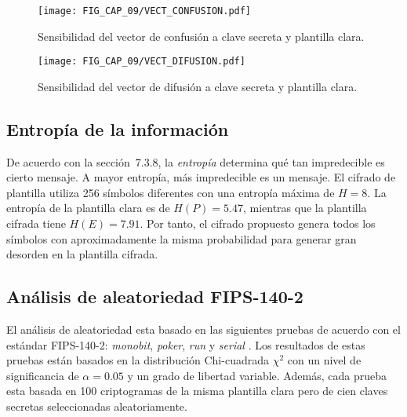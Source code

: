 \begin{figure}[!htbp] %
	\center
	\texttt{[image: FIG\_CAP\_09/VECT\_CONFUSION.pdf]}     
	\caption{Sensibilidad del vector de confusión a clave secreta y plantilla clara.}
\end{figure} 

\begin{figure}[!htbp] %
	\center
	\texttt{[image: FIG\_CAP\_09/VECT\_DIFUSION.pdf]}      
	\caption{Sensibilidad del vector de difusión a clave secreta y plantilla clara.}
\end{figure} 

\subsection{Entropía de la información}
De acuerdo con la sección~7.3.8, la \textit{entropía} determina qué tan impredecible es cierto mensaje. A mayor entropía, más impredecible es un mensaje. El cifrado de plantilla utiliza 256 símbolos diferentes con una entropía máxima de $H=8$. La entropía de la plantilla clara es de $H(P)=5.47$, mientras que la plantilla cifrada tiene $H(E)=7.91$. Por tanto, el cifrado propuesto genera todos los símbolos con aproximadamente la misma probabilidad para generar gran desorden en la plantilla cifrada.

\subsection{Análisis de aleatoriedad FIPS-140-2}
El análisis de aleatoriedad esta basado en las siguientes pruebas de acuerdo con el estándar FIPS-140-2: \textit{monobit}, \textit{poker}, \textit{run} y \textit{serial} \cite{MEtAl_1996}. Los resultados de estas pruebas están basados en la distribución Chi-cuadrada $\chi^{2}$ con un nivel de significancia de $\alpha =0.05$ y un grado de libertad variable. Además, cada prueba esta basada en 100 criptogramas de la misma plantilla clara pero de cien claves secretas seleccionadas aleatoriamente. \\

